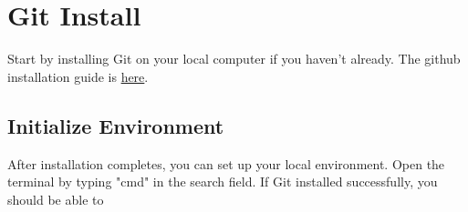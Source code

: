 \documentclass{article}
\begin{document}
\section{Git Install}
Start by installing Git on your local computer if you haven't already.
The github installation guide is  
 \href{https://github.com/git-guides/install-git}{here}.
 
 \subsection{Initialize Environment}
After installation completes, you can set up your local environment.
Open the terminal by typing "cmd" in the search field. If Git installed
successfully, you should be able to
\end{document}
